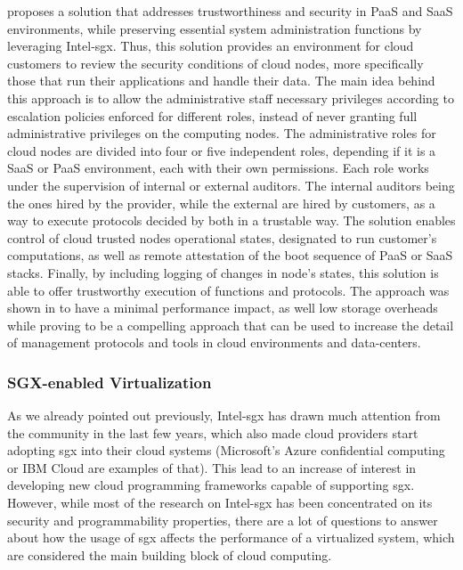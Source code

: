\cite{sgxCloudThesis} proposes a solution that addresses trustworthiness and security in PaaS and SaaS environments, while preserving essential system administration functions by leveraging Intel-\gls{sgx}. Thus, this solution provides an environment for cloud customers to review the security conditions of cloud nodes, more specifically those that run their applications and handle their data.
The main idea behind this approach is to allow the administrative staff necessary privileges according to escalation policies enforced for different roles, instead of never granting full administrative privileges on the computing nodes.
The administrative roles for cloud nodes are divided into four or five independent roles, depending if it is a SaaS or PaaS environment, each with their own permissions. Each role works under the supervision of internal or external auditors. The internal auditors being the ones hired by the provider, while the external are hired by customers, as a way to execute protocols decided by both in a trustable way. The solution enables control of cloud trusted nodes operational states, designated to run customer's computations, as well as remote attestation of the boot sequence of PaaS or SaaS stacks. Finally, by including logging of changes in node's states, this solution is able to offer trustworthy execution of functions and protocols.
The approach was shown in \cite{sgxCloudThesis} to have a minimal performance impact, as well low storage overheads while proving to be a compelling approach that can be used to increase the detail of management protocols and tools in cloud environments and data-centers.\newline

\subsubsection{SGX-enabled Virtualization}



As we already pointed out previously, Intel-\gls{sgx} has drawn much attention from the community in the last few years, which also made cloud providers start adopting \gls{sgx} into their cloud systems (Microsoft's Azure confidential computing or IBM Cloud are examples of that). This lead to an increase of interest in developing new cloud programming frameworks capable of supporting \gls{sgx}.
However, while most of the research on Intel-\gls{sgx} has been concentrated on its security and programmability properties, there are a lot of questions to answer about how the usage of \gls{sgx} affects the performance of a virtualized system, which are considered the main building block of cloud computing.

